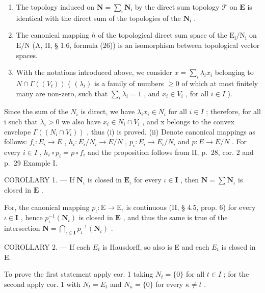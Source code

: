 \begin{enumerate}
\def\labelenumi{(\roman{enumi})}
\item
  The topology induced on \(\mathbf{N} = \sum_{\mathfrak{i}}\mathbf{N}_{\mathfrak{i}}\) by the direct sum topology \(\mathcal{T}\) on \(\mathbf{E}\) is identical with the direct sum of the topologies of the \(\mathbf{N}_{\mathfrak{i}}\) .
\item
  The canonical mapping \(h\) of the topological direct sum space of the \(\mathrm{E}_{\mathrm{i}} / \mathrm{N}_{\mathrm{i}}\) on \(\mathrm{E} / \mathrm{N}\) (A, II, § 1.6, formula (26)) is an isomorphism between topological vector spaces.
\item
  With the notations introduced above, we consider \(x = \sum_{i} \lambda_i x_i\) belonging to \(N \cap \Gamma((V_{t}))\) ( \((\lambda_{t})\) is a family of numbers \(\geqslant 0\) of which at most finitely many are non-zero, such that \(\sum_{i} \lambda_{i} = 1\) , and \(x_{i} \in V_{i}\) , for all \(i \in I\) ).
\end{enumerate}

Since the sum of the \(N_{i}\) is direct, we have \(\lambda_{i}x_{i} \in N_{i}\) for all \(i \in I\) ; therefore, for all i such that \(\lambda_{i} > 0\) we also have \(x_{i} \in N_{i} \cap V_{i}\) , and x belongs to the convex envelope \(\Gamma((N_{i} \cap V_{i}))\) , thus (i) is proved. (ii) Denote canonical mappings as follows: \(f_{i}: E_{i} \to E\) , \(h_{i}: E_{i}/N_{i} \to E/N\) , \(p_{i}: E_{i} \to E_{i}/N_{i}\) and \(p: E \to E/N\) . For every \(i \in I\) , \(h_{i} \circ p_{i} = p \circ f_{i}\) and the proposition follows from II, p.~28, cor. 2 and p.~29 Example I.

COROLLARY 1. --- If \(\mathbf{N}_{\iota}\) is closed in \(\mathbf{E}_{\iota}\) for every \(\iota \in \mathbf{I}\) , then \(\mathbf{N} = \sum \mathbf{N}_{\iota}\) is closed in \(\mathbf{E}\) .

For, the canonical mapping \(p_{\iota} : \mathrm{E} \to \mathrm{E}_{\iota}\) is continuous (II, § 4.5, prop. 6) for every \(\iota \in \mathbf{I}\) , hence \(p_{\iota}^{-1}(\mathbf{N}_{\iota})\) is closed in \(\mathbf{E}\) , and thus the same is true of the intersection \(\mathbf{N} = \bigcap_{\iota \in \mathbf{I}} p_{\iota}^{-1}(\mathbf{N}_{\iota})\) .

COROLLARY 2. --- If each \(E_{t}\) is Hausdorff, so also is E and each \(E_{t}\) is closed in E.

To prove the first statement apply cor. 1 taking \(N_{t} = \{0\}\) for all \(t \in I\) ; for the second apply cor. 1 with \(N_{t} = E_{t}\) and \(N_{\kappa} = \{0\}\) for every \(\kappa \neq t\) .

